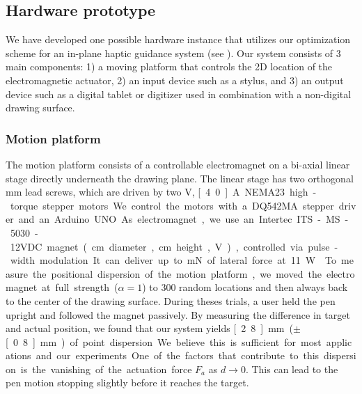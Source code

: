 \subsection{Hardware prototype}
\label{sc:hardware}
We have developed one possible hardware instance that utilizes our optimization scheme for an in-plane haptic guidance system (see ). 
Our system consists of 3 main components: 1) a moving platform that controls the 2D location of the electromagnetic actuator, 2) an input device such as a stylus, and 3) an output device such as a digital tablet or digitizer used in combination with a non-digital drawing surface. 

\subsubsection{Motion platform}
The motion platform consists of a controllable electromagnet on a bi-axial linear stage directly underneath the drawing plane. 
The linear stage has two orthogonal \unit[12]{mm} lead screws, which are driven by two \unit[24]{V}, \unit[4.0]{A} NEMA23 high-torque stepper motors. 
We control the motors with a DQ542MA stepper driver and an Arduino UNO. 
As electromagnet, we use an Intertec ITS-MS-5030-12VDC magnet (\unit[5]{cm} diameter, \unit[3]{cm} height, \unit[12]{V}), controlled via pulse-width modulation.
It can deliver up to \unit[488]{mN} of lateral force at 11 W. 

To measure the positional dispersion of the motion platform, we moved the electromagnet at full strength ($\alpha=1$) to 300 random locations and then always back to the center of the drawing surface. 
During theses trials, a user held the pen upright and followed the magnet passively.
By measuring the difference in target and actual position, we found that our system yields \unit[2.8]{mm} ($\pm$ \unit[0.8]{mm}) of point dispersion.
We believe this is sufficient for most applications and our experiments.
One of the factors that contribute to this dispersion is the vanishing of the actuation force $F_a$ as $d\rightarrow0$. 
This can lead to the pen motion stopping slightly before it reaches the target.

